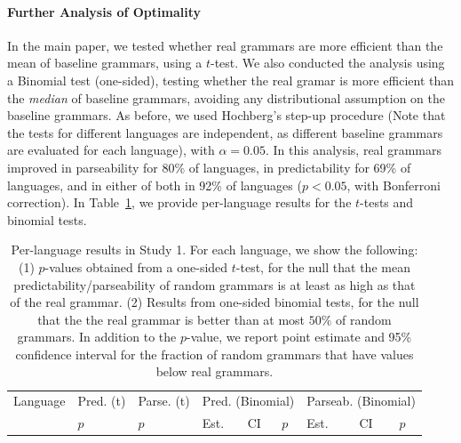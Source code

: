 \documentclass[10pt,twoside,lineno]{article}
\begin{document}
\paragraph{Further Analysis of Optimality}
In the main paper, we tested whether real grammars are more efficient than the mean of baseline grammars, using a $t$-test.
We also conducted the analysis using a Binomial test (one-sided), testing whether the real gramar is more efficient than the \emph{median} of baseline grammars, avoiding any distributional assumption on the baseline grammars.
As before, we used Hochberg's step-up procedure (Note that the tests for different languages are independent, as different baseline grammars are evaluated for each language), with $\alpha=0.05$.
In this analysis, real grammars improved in parseability for 80\% of languages, in predictability for 69\% of languages, and in either of both in 92\% of languages ($p<0.05$, with Bonferroni correction).
In Table~\ref{fig:pareto-per-lang-stats}, we provide per-language results for the $t$-tests and binomial tests.


\begin{table}
\centering
\small{
\begin{tabular}{l||ll|lll|lll}
Language & Pred. (t) & Parse. (t) & \multicolumn{3}{c|}{Pred. (Binomial)} & \multicolumn{3}{c}{Parseab. (Binomial)} \\ 
&  $p$ & $p$ &  Est. &CI & $p$ & Est. & CI & $p$  \\ \hline \hline

\end{tabular}
}
\caption{Per-language results in Study 1. For each language, we show the following: (1) $p$-values obtained from a one-sided $t$-test, for the null that the mean predictability/parseability of random grammars is at least as high as that of the real grammar. (2) Results from one-sided binomial tests, for the null that the the real grammar is better than at most $50 \%$ of random grammars. In addition to the $p$-value, we report point estimate and 95\% confidence interval for the fraction of random grammars that have values below real grammars.}\label{fig:pareto-per-lang-stats}
\end{table}
\end{document}
